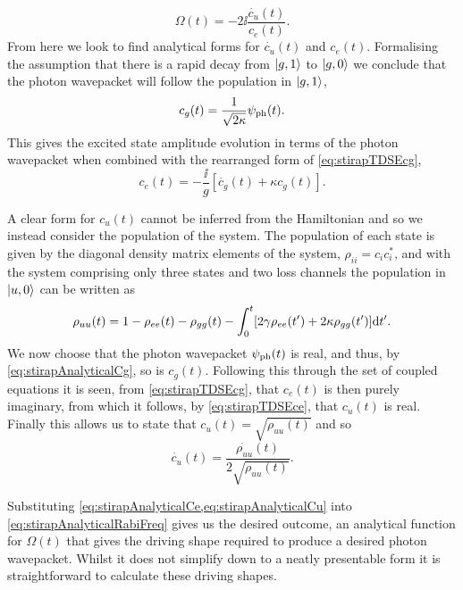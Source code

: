 \documentclass[../Thesis-IJspeert.tex]{subfiles}
\begin{document}
\begin{equation}
	\Omega(t) = -2\ii \frac{\dot{c_u}(t)}{c_e(t)}.
	\label{eq:stirapAnalyticalRabiFreq}
\end{equation}
From here we look to find analytical forms for $\dot{c_u}(t)$ and $c_e(t)$.  Formalising the assumption that there is a rapid decay from $\ket{g,1}$ to $\ket{g,0}$ we conclude that the photon wavepacket will follow the population in $\ket{g,1}$,
\begin{equation}
	c_g(t) = \frac{1}{\sqrt{2\kappa}} \psi_{\mathrm{ph}}(t).
	\label{eq:stirapAnalyticalCg}
\end{equation}
This gives the excited state amplitude evolution in terms of the photon wavepacket when combined with the rearranged form of \cref{eq:stirapTDSEcg},
\begin{equation}
	c_e(t) = -\frac{\ii}{g} \left[ \dot{c_g}(t) + \kappa c_g(t) \right].
	\label{eq:stirapAnalyticalCe}
\end{equation}

A clear form for $c_u(t)$ cannot be inferred from the Hamiltonian and so we instead consider the population of the system.  The population of each state is given by the diagonal density matrix elements of the system, $\rho_{ii} = c_{i}c_{i}^{*}$, and with the system comprising only three states and two loss channels the population in $\ket{u,0}$ can be written as
\begin{equation}
	\rho_{uu}(t) = 1 - \rho_{ee}(t) - \rho_{gg}(t) - \int_0^t \left[ 2\gamma \rho_{ee}(t\dash) + 2\kappa\rho_{gg}(t\dash) \right] \diffd t\dash.
	\label{eq:stirapAnalyticalRhoEE}
\end{equation}
We now choose that the photon wavepacket $\psi_{\mathrm{ph}}(t)$ is real, and thus, by \cref{eq:stirapAnalyticalCg}, so is $c_g(t)$. Following this through the set of coupled equations it is seen, from \cref{eq:stirapTDSEcg}, that $c_e(t)$ is then purely imaginary, from which it follows, by \cref{eq:stirapTDSEce}, that $c_u(t)$ is real.  Finally this allows us to state that $c_u(t)=\sqrt{\rho_{uu}(t)}$ and so
\begin{equation}
	\dot{c_u}(t) = \frac{\dot{\rho_{uu}}(t)}{2\sqrt{\rho_{uu}(t)}}.
	\label{eq:stirapAnalyticalCu}
\end{equation}

Substituting \cref{eq:stirapAnalyticalCe,eq:stirapAnalyticalCu} into \cref{eq:stirapAnalyticalRabiFreq} gives us the desired outcome, an analytical function for $\Omega(t)$ that gives the driving shape required to produce a desired photon wavepacket.  Whilst it does not simplify down to a neatly presentable form it is straightforward to calculate these driving shapes.
\end{document}
